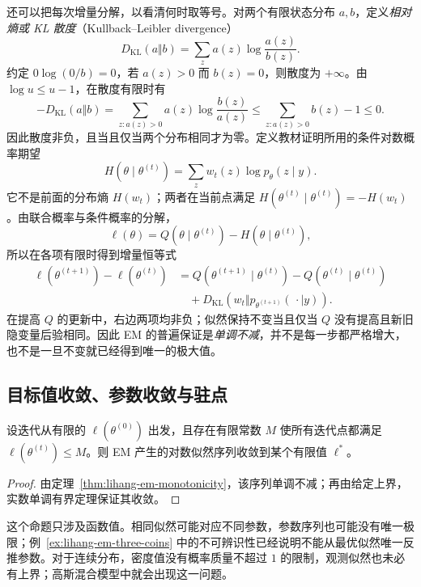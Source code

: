 还可以把每次增量分解，以看清何时取等号。对两个有限状态分布 $a,b$，定义\emph{相对熵或 KL 散度}（Kullback--Leibler divergence）
\[
  D_{\mathrm{KL}}(a\Vert b)=\sum_z a(z)\log\frac{a(z)}{b(z)}.
\]
约定 $0\log(0/b)=0$，若 $a(z)>0$ 而 $b(z)=0$，则散度为 $+\infty$。由 $\log u\leq u-1$，在散度有限时有
\[
  -D_{\mathrm{KL}}(a\Vert b)
  =\sum_{z:a(z)>0}a(z)\log\frac{b(z)}{a(z)}
  \leq\sum_{z:a(z)>0}b(z)-1\leq0.
\]
因此散度非负，且当且仅当两个分布相同才为零。定义教材证明所用的条件对数概率期望
\[
  H(\theta\mid\theta^{(t)})
  =\sum_z w_t(z)\log p_\theta(z\mid y).
\]
它不是前面的分布熵 $H(w_t)$；两者在当前点满足 $H(\theta^{(t)}\mid\theta^{(t)})=-H(w_t)$。由联合概率与条件概率的分解，
\[
  \ell(\theta)=Q(\theta\mid\theta^{(t)})-H(\theta\mid\theta^{(t)}),
\]
所以在各项有限时得到增量恒等式
\begin{equation}
  \begin{aligned}
    \ell(\theta^{(t+1)})-\ell(\theta^{(t)})
    &=Q(\theta^{(t+1)}\mid\theta^{(t)})-Q(\theta^{(t)}\mid\theta^{(t)})\\
    &\quad+D_{\mathrm{KL}}\!\left(w_t\Vert p_{\theta^{(t+1)}}(\,\cdot\mid y)\right).
  \end{aligned}
  \label{eq:lihang-em-increment-identity}
\end{equation}
在提高 $Q$ 的更新中，右边两项均非负；似然保持不变当且仅当 $Q$ 没有提高且新旧隐变量后验相同。因此 EM 的普遍保证是\emph{单调不减}，并不是每一步都严格增大，也不是一旦不变就已经得到唯一的极大值。

\subsection{目标值收敛、参数收敛与驻点}
\label{subsec:lihang-em-stationarity}

\begin{proposition}[目标值的收敛]
\label{prop:lihang-em-value-convergence}
设迭代从有限的 $\ell(\theta^{(0)})$ 出发，且存在有限常数 $M$ 使所有迭代点都满足 $\ell(\theta^{(t)})\leq M$。则 EM 产生的对数似然序列收敛到某个有限值 $\ell^*$。
\end{proposition}

\begin{proof}
由定理~\ref{thm:lihang-em-monotonicity}，该序列单调不减；再由给定上界，实数单调有界定理保证其收敛。
\end{proof}

这个命题只涉及函数值。相同似然可能对应不同参数，参数序列也可能没有唯一极限；例~\ref{ex:lihang-em-three-coins} 中的不可辨识性已经说明不能从最优似然唯一反推参数。对于连续分布，密度值没有概率质量不超过 $1$ 的限制，观测似然也未必有上界；高斯混合模型中就会出现这一问题。

